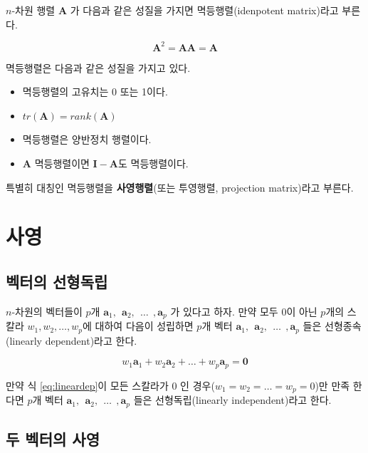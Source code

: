 \documentclass[
]{book}
\providecommand{\tightlist}{%
  \setlength{\itemsep}{0pt}\setlength{\parskip}{0pt}}
\theoremstyle{definition}
\theoremstyle{definition}
\theoremstyle{definition}
\theoremstyle{definition}
\theoremstyle{remark}
\begin{document}
\(n\)-차원 행렬 \(\bm A\) 가 다음과 같은 성질을 가지면 멱등행렬(idenpotent matrix)라고 부른다.

\[ \bm A^2 = \bm A \bm A = \bm A \]

멱등행렬은 다음과 같은 성질을 가지고 있다.

\begin{itemize}
\tightlist
\item
  멱등행렬의 고유치는 0 또는 1이다.
\item
  \(tr(\bm A) =rank(\bm A)\)
\item
  멱등행렬은 양반정치 행렬이다.
\item
  \(\bm A\) 멱등행렬이면 \(\bm I - \bm A\)도 멱등행렬이다.
\end{itemize}

특별히 대칭인 멱등행렬을 \textbf{사영행렬}(또는 투영행렬, projection matrix)라고 부른다.

\hypertarget{uxc0acuxc601}{%
\section{사영}\label{uxc0acuxc601}}

\hypertarget{uxbca1uxd130uxc758-uxc120uxd615uxb3c5uxb9bd}{%
\subsection{벡터의 선형독립}\label{uxbca1uxd130uxc758-uxc120uxd615uxb3c5uxb9bd}}

\(n\)-차원의 벡터들이 \(p\)개 \(\bm a_1, ~~ \bm a_2, ~~\dots ~~, \bm a_p\) 가 있다고 하자.
만약 모두 \(0\)이 아닌 \(p\)개의 스칼라 \(w_1,w_2,\dots,w_p\)에 대하여 다음이 성립하면 \(p\)개 벡터 \(\bm a_1, ~~ \bm a_2, ~~\dots ~~, \bm a_p\) 들은 선형종속(linearly dependent)라고 한다.

\begin{equation}
w_1 \bm a_1 + w_2 \bm a_2 + \dots + w_p \bm a_p = \bm 0 
\label{eq:lineardep}
\end{equation}

만약 식 \eqref{eq:lineardep}이 모든 스칼라가 0 인 경우(\(w_1=w_2=\dots=w_p=0\))만 만족 한다면 \(p\)개 벡터 \(\bm a_1, ~~ \bm a_2, ~~\dots ~~, \bm a_p\) 들은 선형독립(linearly independent)라고 한다.

\hypertarget{uxb450-uxbca1uxd130uxc758-uxc0acuxc601}{%
\subsection{두 벡터의 사영}\label{uxb450-uxbca1uxd130uxc758-uxc0acuxc601}}
\end{document}
